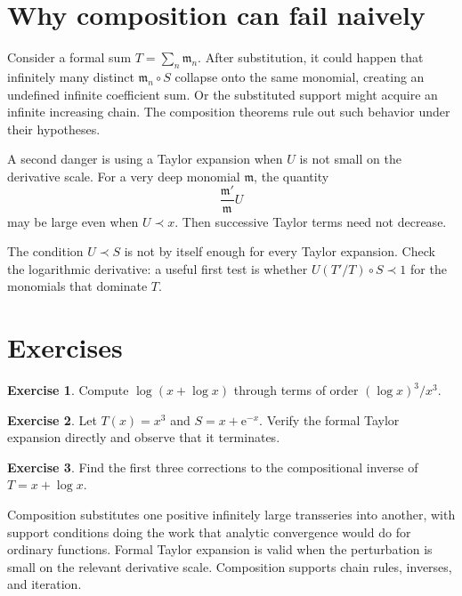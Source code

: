 \documentclass[11pt,openany]{book}
\theoremstyle{definition}
\newtheorem{exercise}{Exercise}[chapter]
\theoremstyle{plain}
\theoremstyle{remark}
\newcommand{\m}{\mathfrak{m}}
\newcommand{\e}{\mathrm{e}}
\newcommand{\precdom}{\prec}
\begin{document}
\section{Why composition can fail naively}

Consider a formal sum $T=\sum_n\m_n$. After substitution, it could happen that infinitely many distinct $\m_n\circ S$ collapse onto the same monomial, creating an undefined infinite coefficient sum. Or the substituted support might acquire an infinite increasing chain. The composition theorems rule out such behavior under their hypotheses.

A second danger is using a Taylor expansion when $U$ is not small on the derivative scale. For a very deep monomial $\m$, the quantity
\[
 \frac{\m'}{\m}U
\]
may be large even when $U\precdom x$. Then successive Taylor terms need not decrease.

\begin{warningbox}
The condition $U\precdom S$ is not by itself enough for every Taylor expansion. Check the logarithmic derivative: a useful first test is whether $U(T'/T)\circ S\precdom1$ for the monomials that dominate $T$.
\end{warningbox}

\section{Exercises}

\begin{exercise}
Compute $\log(x+\log x)$ through terms of order $(\log x)^3/x^3$.
\end{exercise}

\begin{exercise}
Let $T(x)=x^3$ and $S=x+\e^{-x}$. Verify the formal Taylor expansion directly and observe that it terminates.
\end{exercise}

\begin{exercise}
Find the first three corrections to the compositional inverse of $T=x+\log x$.
\end{exercise}

\begin{summarybox}
Composition substitutes one positive infinitely large transseries into another, with support conditions doing the work that analytic convergence would do for ordinary functions. Formal Taylor expansion is valid when the perturbation is small on the relevant derivative scale. Composition supports chain rules, inverses, and iteration.
\end{summarybox}
\end{document}
